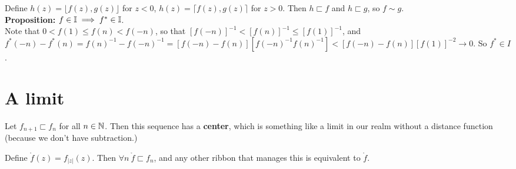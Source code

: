 \documentclass{article}
\renewcommand{\b}{\textbf}
\newcommand{\ribbons}{\Bbb I}
\newcommand{\forks}{ \sqsubset}
\renewcommand{\center}{\mathring f  }
\begin{document}
\begin{huge}
{{Define $h(z) = \lfloor f(z),g(z) \rfloor$ for $z < 0$, $h(z) = \lceil f(z),g(z) \rceil$ for $ z > 0$. Then $h \forks f$ and $h \forks g$, so $f \sim g$.\\

\b{Proposition:} $f \in \ribbons \implies f^* \in \ribbons$.\\


Note that $0 < f(1) \le f(n) < f(-n)$, so that $[f(-n)]^{-1} <  [f(n)]^{-1} \le [f(1)]^{-1}$, and $f^*(-n) - f^* (n) = f(n)^{-1} - f(-n)^{-1} = [f(-n) - f(n)][f(-n)^{-1}f(n)^{-1}] < [f(-n) - f(n)][f(1)]^{-2} \to 0$. So $f^* \in I$.\\

\section{A limit}

Let  $f_{n+1} \forks f_n$ for all $n \in \Bbb N$. Then this sequence has a \b{center}, which is something like a limit in our realm without a distance function (because we don't have subtraction.) 

Define $\center(z) =  f_{|z|}(z).$ Then $\forall n \ \center \forks f_n$, and any other ribbon that manages this is equivalent to $\center$.

}}

\end{huge}
\end{document}
